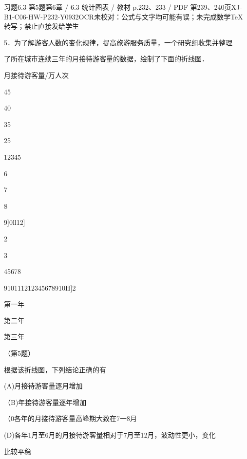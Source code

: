 \begin{bankitem}{习题6.3 第5题}{第6章 / 6.3 统计图表 / 教材 p.232、233 / PDF 第239、240页}{XJ-B1-C06-HW-P232-Y0932}{OCR未校对：公式与文字均可能有误；未完成数学TeX转写；禁止直接发给学生}
\begin{ocrdraft}
\par
5．为了解游客人数的变化规律，提高旅游服务质量，一个研究组收集并整理
\par
了所在城市连续三年的月接待游客量的数据，绘制了下面的折线图．
\par
月接待游客量/万人次
\par
45
\par
40
\par
35
\par
25
\par
12345
\par
6
\par
7
\par
8
\par
9]0ll12]
\par
2
\par
3
\par
45678
\par
910111212345678910H]2
\par
第一年
\par
第二年
\par
第三年
\par
（第5题）
\par
根据该折线图，下列结论正确的有
\par
(A)月接待游客量逐月增加
\par
（B)年接待游客量逐年增加
\par
（0各年的月接待游客量高峰期大致在7一8月
\par
(D)各年1月至6月的月接待游客量相对于7月至12月，波动性更小，变化
\par
[教材p.233 / PDF第240页]
\par
比较平稳
\end{ocrdraft}
\end{bankitem}

